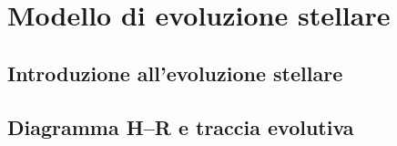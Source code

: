 \section{Modello di evoluzione stellare}\label{sec:modello-evoluzione-stellare}

\subsection{Introduzione all'evoluzione stellare}
\subsection{Diagramma H--R e traccia evolutiva}
